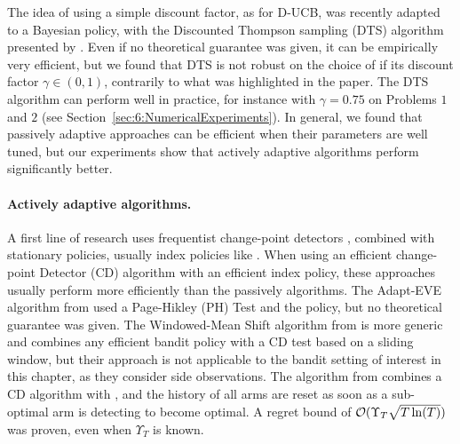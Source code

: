 The idea of using a simple discount factor, as for D-UCB, was recently adapted to a Bayesian policy, with the Discounted Thompson sampling (DTS) algorithm presented by \cite{RajKalyani17}.
Even if no theoretical guarantee was given, it can be empirically very efficient, but we found that DTS is not robust on the choice of if its discount factor $\gamma\in(0,1)$, contrarily to what was highlighted in the paper.
The DTS algorithm can perform well in practice, for instance with $\gamma=0.75$ on Problems $1$ and $2$ (see Section~\ref{sec:6:NumericalExperiments}).
%
In general, we found that passively adaptive approaches can be efficient when their parameters are well tuned, but our experiments show that actively adaptive algorithms perform significantly better.




\paragraph{Actively adaptive algorithms.}
%
A first line of research uses frequentist change-point detectors \cite{Basseville93}, combined with stationary policies, usually index policies like \UCB.
When using an efficient change-point Detector (CD) algorithm with an efficient index policy, these approaches usually perform more efficiently than the passively algorithms.
%
The Adapt-EVE algorithm from \cite{Hartland06} used a Page-Hikley (PH) Test and the \UCB{} policy, but no theoretical guarantee was given.
%
The Windowed-Mean Shift algorithm from \cite{YuMannor09} is more generic and combines any efficient bandit policy with a CD test based on a sliding window, but their approach is not applicable to the bandit setting of interest in this chapter, as they consider side observations.
%
The \ExpThreeR{} algorithm from \cite{Allesiardo15,Allesiardo17} combines a CD algorithm with \ExpThree, and the history of all arms are reset as soon as a sub-optimal arm is detecting to become optimal.
A regret bound of $\mathcal{O}(\Upsilon_T \sqrt{T \ln(T)})$ was proven, even when $\Upsilon_T$ is known.

